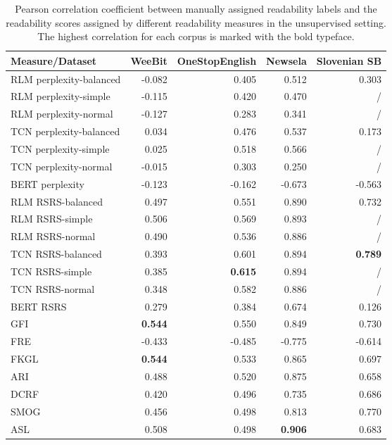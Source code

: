 \documentclass{clv3}
\begin{document}
\begin{table*}[b]
\begin{center}
\caption{Pearson correlation coefficient between manually assigned readability labels and the readability scores assigned by different readability measures in the unsupervised setting. The highest correlation for each corpus is marked with the bold typeface.} 
\begin{tabular}{lrrrr}
  Measure/Dataset & WeeBit & OneStopEnglish & Newsela & Slovenian SB \\
  \hline     
  RLM perplexity-balanced & -0.082 & 0.405 & 0.512 & 0.303 \\
  RLM perplexity-simple & -0.115 & 0.420 & 0.470 & / \\
  RLM perplexity-normal & -0.127 & 0.283 & 0.341 & / \\
  TCN perplexity-balanced & 0.034 & 0.476 & 0.537 & 0.173 \\
  TCN perplexity-simple & 0.025 & 0.518 & 0.566 & / \\
  TCN perplexity-normal & -0.015 & 0.303 & 0.250 & / \\
  BERT perplexity & -0.123 & -0.162 & -0.673 & -0.563  \\
  \hline
  RLM RSRS-balanced & 0.497 & 0.551 & 0.890 & 0.732 \\
  RLM RSRS-simple & 0.506 & 0.569 & 0.893 & / \\
  RLM RSRS-normal & 0.490 & 0.536 & 0.886 & / \\
  TCN RSRS-balanced & 0.393 & 0.601 & 0.894 &  \textbf{0.789} \\
  TCN RSRS-simple & 0.385 & \textbf{0.615} & 0.894 & / \\
  TCN RSRS-normal & 0.348 & 0.582 & 0.886 & / \\
  BERT RSRS & 0.279 & 0.384 & 0.674 & 0.126 \\
  \hline
  GFI & \textbf{0.544} & 0.550 & 0.849 & 0.730 \\
  FRE & -0.433 & -0.485 & -0.775 & -0.614 \\
  FKGL & \textbf{0.544} & 0.533 & 0.865 & 0.697\\
  ARI & 0.488 & 0.520 & 0.875 & 0.658 \\
  DCRF & 0.420 & 0.496 & 0.735 & 0.686 \\
  SMOG & 0.456 & 0.498 & 0.813 & 0.770 \\
  ASL & 0.508 & 0.498 & \textbf{0.906} & 0.683 \\
  \hline
\end{tabular}
\label{table:resultsUnsupervised}
 \end{center}
\end{table*}
\end{document}
